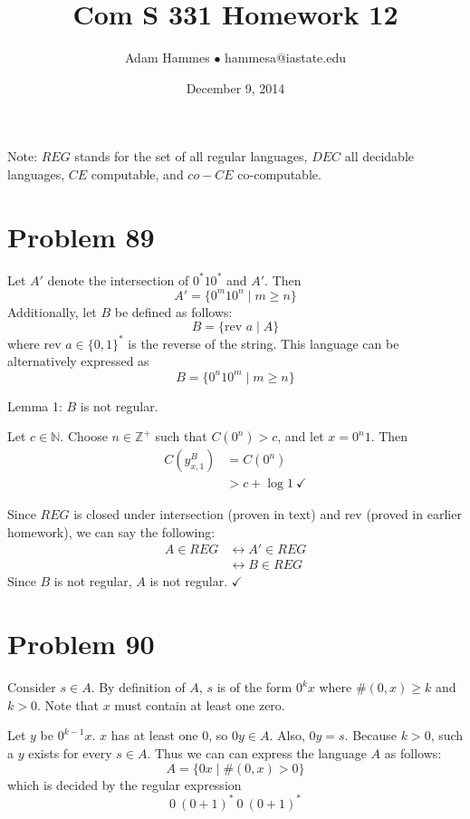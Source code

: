 \documentclass[11pt]{article}
\let\iff\leftrightarrow
\begin{document}
\title{Com S 331 Homework 12}
\author{Adam Hammes $\bullet$ hammesa@iastate.edu}
\date{December 9, 2014}
\maketitle

Note: $REG$ stands for the set of all regular languages, $DEC$ all decidable languages, $CE$ computable, and $co-CE$ co-computable.


\section*{Problem 89}

Let $A'$ denote the intersection of $0^*10^*$ and $A'$.
Then
	\[A' = \{0^m10^n \mid  m \geq n \}\]
Additionally, let $B$ be defined as follows:
	\[B = \{ \text{rev } a \mid A \} \]
where rev $a \in \{0,1\}^*$ is the reverse of the string.
This language can be alternatively expressed as
	\[ B = \{0^n10^m \mid m \geq n\}\]

Lemma 1: $B$ is not regular.

Let $c \in \mathbb{N}$.
Choose $n \in \mathbb{Z}^+$ such that $C(0^n) > c$, and let $x = 0^n1$.
Then
	\begin{align*}
		C( y^{B} _{x,1} ) &= C( 0^n) \\
		&> c + \log 1\ \checkmark
	\end{align*}

Since $REG$ is closed under intersection (proven in text) and rev (proved in earlier homework), we can say the following:
	\begin{align*}
		A \in REG &\iff A' \in REG \\
		&\iff B \in REG
	\end{align*}
Since $B$ is not regular, $A$ is not regular. $\checkmark$


\section*{Problem 90}

Consider $s \in A$.
By definition of $A$, $s$ is of the form $0^kx$ where $\#(0,x) \geq k$ and $k>0$.
Note that $x$ must contain at least one zero.

Let $y$ be $0^{k-1}x$. $x$ has at least one 0, so $0y \in A$.
Also, $0y = s$.
Because $k >0$, such a $y$ exists for every $s \in A$.
Thus we can can express the language $A$ as follows:
	\[ A = \{0x \mid \#(0,x) > 0 \}\]
which is decided by the regular expression
	\[ 0\ (0+1)^*\ 0\ (0+1)^*\]
\end{document}

